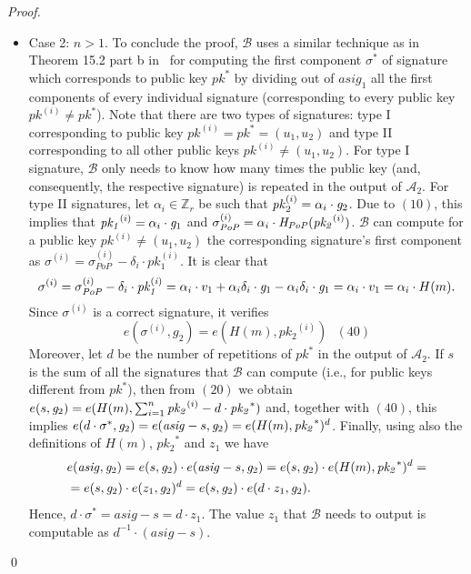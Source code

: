 \begin{proof}
\begin{itemize}
\item Case 2: $ n > 1$. To conclude the proof, $\mathcal{B}$ uses a similar technique 
as in Theorem 15.2 part b in~\cite{dabo_book} for computing the first component $\sigma^*$ of signature 
which corresponds to public key $\mathit{pk}^*$ by dividing out of $\mathit{asig_1}$ all the first components of every 
individual signature (corresponding to every public key $\mathit{pk^{(i)}} \neq \mathit{pk^*}$). Note that  
there are two types of signatures: type I corresponding to public key $\mathit{pk^{(i)}} =  \mathit{pk^*} = (u_1, u_2)$ and type II
corresponding to all other public keys $\mathit{pk^{(i)}} \neq (u_1, u_2)$. For type I signature, $\mathcal{B}$
only needs to know how many times the public key (and, consequently, the respective signature) is repeated in the output of $\mathcal{A}_2$. 
For type II signatures, let $\alpha_i \in \mathbb{Z}_r$ be such that $\mathit{pk}_2^{(i)} = \alpha_i \cdot \mathit{g}_{2}$. Due to $(10)$, this implies 
that $\mathit{pk_1}^{(i)} = \alpha_i \cdot \mathit{g}_{1}$ and 
$\sigma_{\mathit{PoP}}^{(i)} = \alpha_i \cdot \mathit{H}_{\mathit{PoP}}(\mathit{pk_2}^{(i)})$. $\mathcal{B}$ can compute for a public key $\mathit{pk^{(i)}} \neq (u_1, u_2)$ 
the corresponding signature's first component as $\sigma^{(i)} = \sigma_{\mathit{PoP}}^{(i)} - \delta_i \cdot \mathit{pk_1^{(i)}}$. It is clear that 
$$\sigma^{(i)} = \sigma_{\mathit{PoP}}^{(i)} - \delta_i \cdot \mathit{pk_1^{(i)}} = \alpha_i \cdot v_1 + \alpha_i \delta_i \cdot \mathit{g}_{1} - 
\alpha_i \delta_i \cdot \mathit{g}_{1} =  \alpha_i \cdot v_1  = \alpha_i \cdot H(m).$$
\noindent Since $\sigma^{(i)}$ is a correct signature, it verifies $$e(\sigma^{(i)}, g_2) = e(H(m), \mathit{pk_2}^{(i)}) \ \ \ (40)$$ 
Moreover, let $d$ be the number of repetitions of $\mathit{pk}^{*}$ in the output of $\mathcal{A}_2$. 
If $s$ is the sum of all the signatures that $\mathcal{B}$ can compute 
(i.e., for public keys different from $\mathit{pk}^{*}$), then from $(20)$ we obtain 
$e(s,\mathit{g}_{2}) = e(H(m), \sum_{i=1}^n \mathit{pk_2}^{(i)} - d \cdot \mathit{pk_2}^{*})$ and, together with $(40)$, this implies 
$e(d \cdot \sigma^{*}, \mathit{g}_{2}) = e(\mathit{asig} - s, \mathit{g}_{2}) = e(H(m), \mathit{pk_2}^{*})^d$.
Finally, using also the definitions of $H(m)$, $\mathit{pk_2}^{\ast}$ and $z_1$ we have 
\begin{align*}
& e(\mathit{asig}, \mathit{g}_{2}) = e(s, \mathit{g}_{2}) \cdot e(\mathit{asig} - s, \mathit{g}_{2}) = e(s, \mathit{g}_{2}) \cdot e(H(m), \mathit{pk_2}^{*})^d =  \\
& = e(s, \mathit{g}_{2}) \cdot e(z_1, \mathit{g}_{2})^{d} = e(s, \mathit{g}_{2}) \cdot e(d \cdot z_1, \mathit{g}_{2}).  
\end{align*} 
\noindent Hence, $ d \cdot \sigma^{*} = \mathit{asig} - s = d \cdot z_1$. The value $z_1$ that $\mathcal{B}$ 
needs to output is computable as $d^{-1} \cdot (\mathit{asig} - s)$. 
\end{itemize}
\qed
\end{proof}
